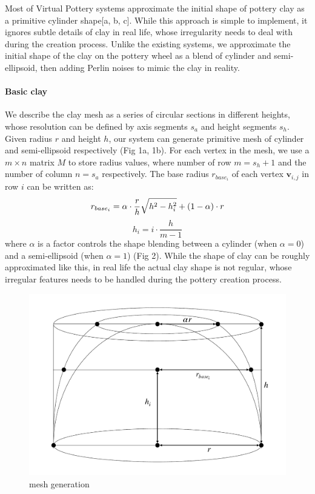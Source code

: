 Most of Virtual Pottery systems approximate the initial shape of pottery clay as a primitive cylinder shape[a, b, c]. While this approach is simple to implement, it ignores subtle details of clay in real life, whose irregularity needs to deal with during the creation process. Unlike the existing systems, we approximate the initial shape of the clay on the pottery wheel as a blend of cylinder and semi-ellipsoid, then adding Perlin noises to mimic the clay in reality.


\paragraph{Basic clay} We describe the clay mesh as a series of circular sections in different heights, whose resolution can be defined by axis segments $s_{a}$ and height segments $s_{h}$. Given radius $r$ and height $h$, our system can generate primitive mesh of cylinder and semi-ellipsoid respectively (Fig 1a, 1b).
For each vertex in the mesh, we use a $m \times n$ matrix $M$ to store radius values, where number of row $m = s_{h} + 1$ and the number of column $n = s_{a}$ respectively. The base radius $r_{base_{i}}$ of each vertex $\mathbf{v}_{i,j}$ in row $i$ can be written as: 
\begin{equation}
r_{base_{i}} = \alpha \cdot \frac{r}{h} \sqrt{h^2 -  h_{i}^2} + (1 - \alpha) \cdot r \\
\end{equation}
\begin{equation}
h_{i} = i \cdot \frac{h}{m-1}
\end{equation}
where $\alpha$ is a factor controls the shape blending between a  cylinder (when $\alpha=0$) and a semi-ellipsoid (when $\alpha=1$) (Fig 2).
While the shape of clay can be roughly approximated like this, in real life the actual clay shape is not regular, whose irregular features needs to be handled during the pottery creation process.

\begin{figure}
  \includegraphics[width=\textwidth]{fig3.pdf}
\caption{mesh generation}
\label{fig:1}       %
\end{figure}

